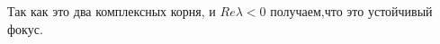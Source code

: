 \documentclass[11pt]{article}
\begin{document}
\begin{enumerate}
		Так как это два комплексных корня, и $Re  \lambda < 0$ получаем,что это устойчивый фокус.
		\begin{figure}[htbp!]
			\centering
\end{figure}
\end{enumerate}
\end{document}

